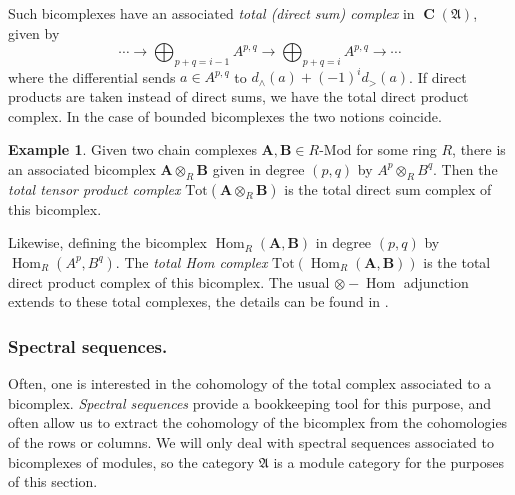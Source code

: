 \documentclass[a4paper]{article}
\theoremstyle{definition}
\newtheorem{example}[defn]{Example}
\theoremstyle{remark}
\newcommand{\Mod}{\ensuremath{\text{-Mod}}}
\DeclareMathOperator{\Hom}{\text{Hom}}
\DeclareMathOperator{\Ch}{\mathbf{C}}
\begin{document}
Such bicomplexes have an associated \textit{total (direct sum) complex} in
\(\Ch(\mathfrak{A})\), given by 
\[ \cdots \rightarrow \bigoplus_{p+q=i-1}A^{p,q} \longrightarrow
\bigoplus_{p+q=i}A^{p,q} \rightarrow \cdots\]
where the differential sends \(a\in A^{p,q}\) to \(d_\wedge(a) + (-1)^i
d_>(a)\). If direct products are taken instead of direct sums, we have the total
direct product complex. In the case of bounded bicomplexes the two notions
coincide.

\begin{example}
    Given two chain complexes \(\mathbf{A}, \mathbf{B}\in R\Mod\) for some ring
    \(R\), there is an associated bicomplex \(\mathbf{A}\otimes_R \mathbf{B}\)
    given in degree \((p,q)\) by \(A^p\otimes_R B^q\). Then the \textit{total tensor
    product complex} \(\text{Tot}(\mathbf{A}\otimes_R \mathbf{B})\) is the total
    direct sum complex of this bicomplex. 

    Likewise, defining the bicomplex \(\Hom_R(\mathbf{A},\mathbf{B})\) in degree
    \((p,q)\) by \(\Hom_R(A^p,B^q)\). The \textit{total Hom complex}
    \(\text{Tot} (\Hom_R(\mathbf{A},\mathbf{B}))\) is the total direct
    product complex of this bicomplex. The
    usual \({\otimes-\Hom}\) adjunction extends to
    these total complexes, the details can be
    found in .
\end{example} 

\subsubsection{Spectral sequences.} 
Often, one is interested in the cohomology of the total complex associated to
a bicomplex. \textit{Spectral sequences} provide a bookkeeping tool for this
purpose, and often allow us to extract the cohomology of the bicomplex from the
cohomologies of the rows or columns. We will only deal with spectral sequences
associated to bicomplexes of modules, so the category \(\mathfrak{A}\) is a
module category for the purposes of this section.
\end{document}
